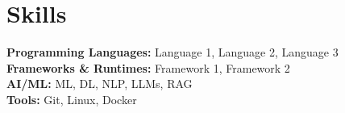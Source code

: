 
\section{Skills}

\resumeSkillListStart
    \small
    \item{
        \textbf{Programming Languages:} Language 1, Language 2, Language 3 \\
        \textbf{Frameworks \& Runtimes:} Framework 1, Framework 2 \\
        \textbf{AI/ML:} ML, DL, NLP, LLMs, RAG \\
        \textbf{Tools:} Git, Linux, Docker
    }
\resumeSkillListEnd


